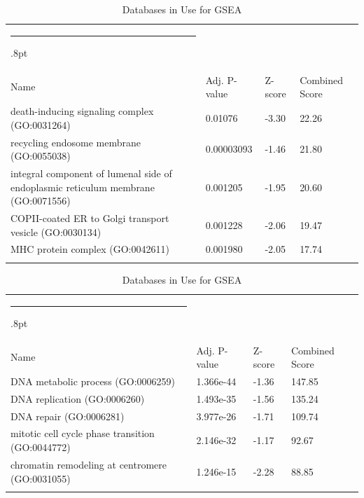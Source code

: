 \documentclass[3p,authoryear,preprint,12pt]{elsarticle}
\makeatletter
\def\hlinewd#1{%
  \noalign{\ifnum0=`}\fi\hrule \@height #1%
  \futurelet\reserved@a\@xhline}
\def\tbltoprule{\hlinewd{.8pt}\\[-12pt]}
\def\tblbottomrule{\noalign{\vspace*{6pt}}\hline\noalign{\vspace*{2pt}}}
\def\tblmidrule{\noalign{\vspace*{6pt}}\hline\noalign{\vspace*{2pt}}}
\makeatother
\begin{document}
\begin{table}[!htbp]
	\caption{{Databases in Use for GSEA} }
	\label{tw-de478ae31cc6}
	\def\arraystretch{1}
	\ignorespaces 
	\centering 
	\begin{tabulary}{\linewidth}{p{\dimexpr.65\tabcolsep}p{\dimexpr.15\tabcolsep}p{\dimexpr.1\tabcolsep}p{\dimexpr.1\tabcolsep}}
		\tbltoprule Name & Adj. P-value & Z-score & Combined Score\\
		\tblmidrule
death-inducing signaling complex (GO:0031264) & 0.01076 & -3.30 & 22.26 \\
recycling endosome membrane (GO:0055038) & 0.00003093 & -1.46 & 21.80 \\
integral component of lumenal side of endoplasmic reticulum membrane (GO:0071556) & 0.001205 & -1.95 & 20.60 \\
COPII-coated ER to Golgi transport vesicle (GO:0030134) & 0.001228 & -2.06 & 19.47 \\
MHC protein complex (GO:0042611) & 0.001980 & -2.05 & 17.74 \\
		\tblbottomrule
	\end{tabulary}\par 
\end{table}
\begin{table}[!htbp]
	\caption{{Databases in Use for GSEA} }
	\label{tw-de478ae31cc6}
	\def\arraystretch{1}
	\ignorespaces 
	\centering 
	\begin{tabulary}{\linewidth}{p{\dimexpr.65\tabcolsep}p{\dimexpr.15\tabcolsep}p{\dimexpr.1\tabcolsep}p{\dimexpr.1\tabcolsep}}
		\tbltoprule Name & Adj. P-value & Z-score & Combined Score\\
		\tblmidrule
DNA metabolic process (GO:0006259) & 1.366e-44 & -1.36 & 147.85 \\
DNA replication (GO:0006260) & 1.493e-35 & -1.56 & 135.24 \\
DNA repair (GO:0006281) & 3.977e-26 & -1.71 & 109.74 \\
mitotic cell cycle phase transition (GO:0044772) & 2.146e-32 & -1.17 & 92.67 \\
chromatin remodeling at centromere (GO:0031055) & 1.246e-15 & -2.28 & 88.85 \\
		\tblbottomrule
	\end{tabulary}\par 
\end{table}
\end{document}
